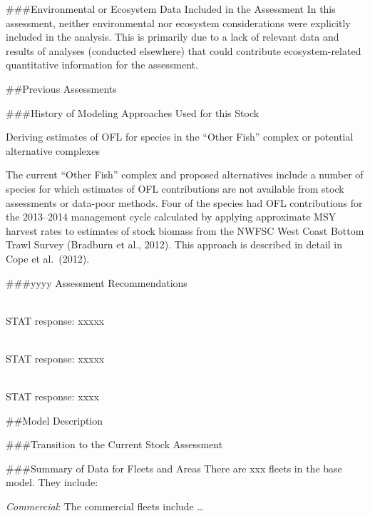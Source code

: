 \documentclass[12pt,]{article}
\begin{document}
\#\#\#Environmental or Ecosystem Data Included in the Assessment In this
assessment, neither environmental nor ecosystem considerations were
explicitly included in the analysis. This is primarily due to a lack of
relevant data and results of analyses (conducted elsewhere) that could
contribute ecosystem-related quantitative information for the
assessment.

\newpage

\#\#Previous Assessments

\#\#\#History of Modeling Approaches Used for this Stock

Deriving estimates of OFL for species in the ``Other Fish'' complex or
potential alternative complexes

The current ``Other Fish'' complex and proposed alternatives include a
number of species for which estimates of OFL contributions are not
available from stock assessments or data-poor methods. Four of the
species had OFL contributions for the 2013--2014 management cycle
calculated by applying approximate MSY harvest rates to estimates of
stock biomass from the NWFSC West Coast Bottom Trawl Survey (Bradburn et
al., 2012). This approach is described in detail in Cope et al.~(2012).

\#\#\#yyyy Assessment Recommendations

\begin{description}[style=unboxed]

  \item[Recommendation 1: ] \hfill \\

   STAT response: xxxxx

\item[Recommendation 2: ] \hfill \\

  STAT response: xxxxx

\item[Recommendation 3: ] \hfill \\

  STAT response: xxxx

  
\end{description}

\#\#Model Description

\#\#\#Transition to the Current Stock Assessment

\#\#\#Summary of Data for Fleets and Areas There are xxx fleets in the
base model. They include:

\emph{Commercial}: The commercial fleets include \ldots{}
\end{document}
